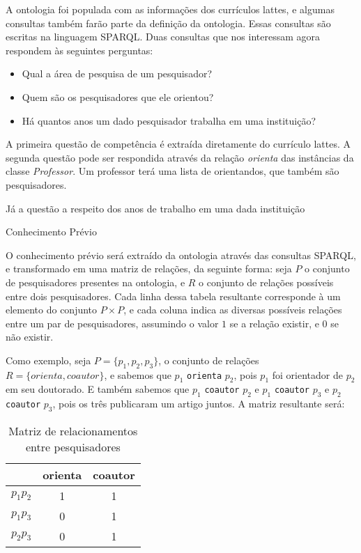A ontologia foi populada com as informações dos currículos lattes, e algumas consultas também farão parte da definição da ontologia. Essas consultas são escritas na linguagem SPARQL. Duas consultas que nos interessam agora respondem às seguintes perguntas:

\begin{itemize}
    \item Qual a área de pesquisa de um pesquisador?
    \item Quem são os pesquisadores que ele orientou?
    \item Há quantos anos um dado pesquisador trabalha em uma instituição?
\end{itemize}

A primeira questão de competência é extraída diretamente do currículo lattes. A segunda questão pode ser respondida através da relação \textit{orienta} das instâncias da classe \textit{Professor}. Um professor terá uma lista de orientandos, que também são pesquisadores.

Já a questão a respeito dos anos de trabalho em uma dada instituição

Conhecimento Prévio

O conhecimento prévio será extraído da ontologia através das consultas SPARQL, e transformado em uma matriz de relações, da seguinte forma: seja $P$ o conjunto de pesquisadores presentes na ontologia, e $R$ o conjunto de relações possíveis entre dois pesquisadores.  Cada linha dessa tabela resultante corresponde à um elemento do conjunto $P \times P$, e cada coluna indica as diversas possíveis relações entre um par de pesquisadores, assumindo o valor $1$ se a relação existir, e $0$ se não existir.

Como exemplo, seja $P = \{ p_1, p_2, p_3 \}$, o conjunto de relações $R = \{ orienta, coautor \}$, e sabemos que $p_1$ \texttt{orienta} $p_2$, pois $p_1$ foi orientador de $p_2$ em seu doutorado. E também sabemos que $p_1$ \texttt{coautor} $p_2$ e $p_1$ \texttt{coautor} $p_3$ e $p_2$ \texttt{coautor} $p_3$, pois os três publicaram um artigo juntos. A matriz resultante será:

\begin{table}[h!]
    \centering
    \begin{tabular}{|c|c|c|}
     \hline
      & orienta & coautor \\
     \hline\hline
     $p_1 p_2$ & 1 & 1  \\
     \hline
     $p_1 p_3$ & 0 & 1  \\
     \hline
     $p_2 p_3$ & 0 & 1  \\
     \hline
    \end{tabular}
    \caption{Matriz de relacionamentos entre pesquisadores}
    \label{matriz-relacoes}
\end{table}


